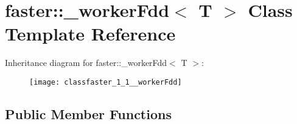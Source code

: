 \hypertarget{classfaster_1_1__workerFdd}{}\section{faster\+:\+:\+\_\+worker\+Fdd$<$ T $>$ Class Template Reference}
\label{classfaster_1_1__workerFdd}
Inheritance diagram for faster\+:\+:\+\_\+worker\+Fdd$<$ T $>$\+:\begin{figure}[H]
\begin{center}
\leavevmode
\texttt{[image: classfaster\_1\_1\_\_workerFdd]}
\end{center}
\end{figure}
\subsection*{Public Member Functions}
